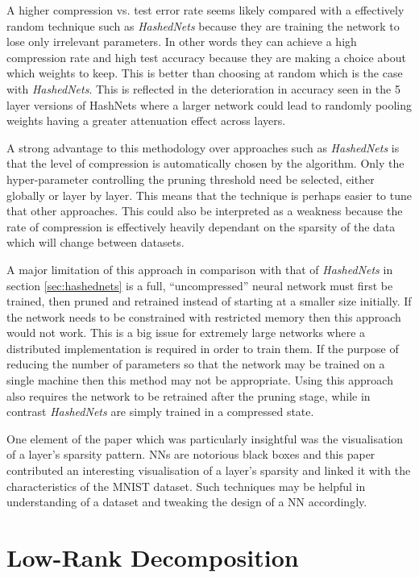 \documentclass[journal]{IEEEtran}
\begin{document}
A higher compression vs. test error rate seems likely compared with a effectively random technique such as \textit{HashedNets} because they are training the network to lose only irrelevant parameters. In other words they can achieve a high compression rate and high test accuracy because they are making a choice about which weights to keep. This is better than choosing at random which is the case with \textit{HashedNets}. This is reflected in the deterioration in accuracy seen in the 5 layer versions of HashNets where a larger network could lead to randomly pooling weights having a greater attenuation effect across layers.

A strong advantage to this methodology over approaches such as \textit{HashedNets} is that the level of compression is automatically chosen by the algorithm. Only the hyper-parameter controlling the pruning threshold need be selected, either globally or layer by layer. This means that the technique is perhaps easier to tune that other approaches. This could also be interpreted as a weakness because the rate of compression is effectively heavily dependant on the sparsity of the data which will change between datasets.

A major limitation of this approach in comparison with that of \textit{HashedNets} in section \ref{sec:hashednets} is a full, ``uncompressed'' neural network must first be trained, then pruned and retrained instead of starting at a smaller size initially. If the network needs to be constrained with restricted memory then this approach would not work. This is a big issue for extremely large networks where a distributed implementation is required in order to train them. If the purpose of reducing the number of parameters so that the network may be trained on a single machine then this method may not be appropriate. Using this approach also requires the network to be retrained after the pruning stage, while in contrast \textit{HashedNets} are simply trained in a compressed state.

One element of the paper which was particularly insightful was the visualisation of a layer's sparsity pattern. NNs are notorious black boxes and this paper contributed an interesting visualisation of a layer's sparsity and linked it with the characteristics of the MNIST dataset. Such techniques may be helpful in understanding of a dataset and tweaking the design of a NN accordingly.

\section{Low-Rank Decomposition}
\end{document}
